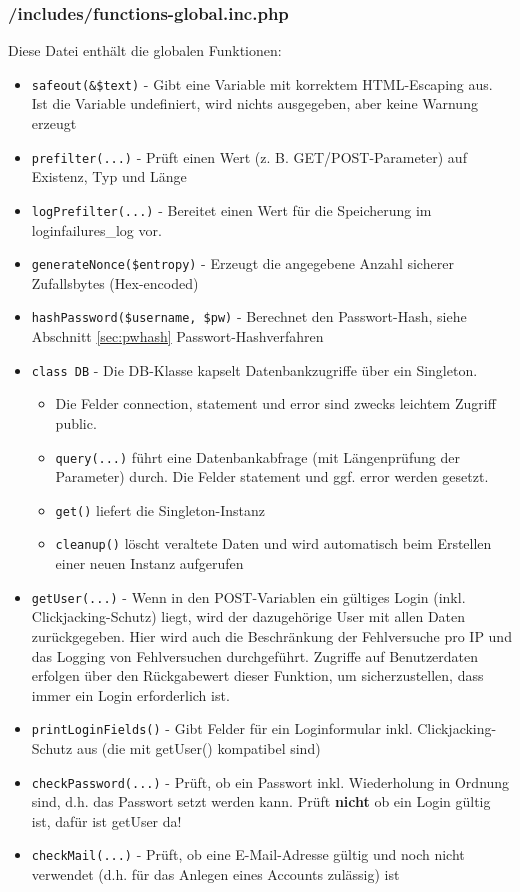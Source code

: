 \documentclass[parskip=half]{scrartcl}
\begin{document}
\subsubsection{/includes/functions-global.inc.php}
Diese Datei enthält die globalen Funktionen:
\begin{itemize}
	\item \texttt{safeout(\&\$text)} - Gibt eine Variable mit korrektem HTML-Escaping aus. Ist die Variable undefiniert, wird nichts ausgegeben, aber keine Warnung erzeugt
	\item \texttt{prefilter(...)} - Prüft einen Wert (z. B. GET/POST-Parameter) auf Existenz, Typ und Länge
	\item \texttt{logPrefilter(...)} - Bereitet einen Wert für die Speicherung im loginfailures\_log vor.
	\item \texttt{generateNonce(\$entropy)} - Erzeugt die angegebene Anzahl sicherer Zufallsbytes (Hex-encoded)
	\item \texttt{hashPassword(\$username, \$pw)} - Berechnet den Passwort-Hash, siehe Abschnitt \ref{sec:pwhash} Passwort-Hashverfahren
	\item \texttt{class DB} - Die DB-Klasse kapselt Datenbankzugriffe über ein Singleton.
	\begin{itemize}
		\item Die Felder connection, statement und error sind zwecks leichtem Zugriff public.
		\item \texttt{query(...)} führt eine Datenbankabfrage (mit Längenprüfung der Parameter) durch. Die Felder statement und ggf. error werden gesetzt.
		\item \texttt{get()} liefert die Singleton-Instanz
		\item \texttt{cleanup()} löscht veraltete Daten und wird automatisch beim Erstellen einer neuen Instanz aufgerufen
	\end{itemize}
	\item \texttt{getUser(...)} - Wenn in den POST-Variablen ein gültiges Login (inkl. Clickjacking-Schutz) liegt, wird der dazugehörige User mit allen Daten zurückgegeben.
								Hier wird auch die Beschränkung der Fehlversuche pro IP und das Logging von Fehlversuchen durchgeführt.
								Zugriffe auf Benutzerdaten erfolgen über den Rückgabewert dieser Funktion, um sicherzustellen, dass immer ein Login erforderlich ist.
	\item \texttt{printLoginFields()} - Gibt Felder für ein Loginformular inkl. Clickjacking-Schutz aus (die mit getUser() kompatibel sind)
	\item \texttt{checkPassword(...)} - Prüft, ob ein Passwort inkl. Wiederholung in Ordnung sind, d.h. das Passwort setzt werden kann.
										Prüft \textbf{nicht} ob ein Login gültig ist, dafür ist getUser da!
	\item \texttt{checkMail(...)} - Prüft, ob eine E-Mail-Adresse gültig und noch nicht verwendet (d.h. für das Anlegen eines Accounts zulässig) ist
\end{itemize}
\end{document}

